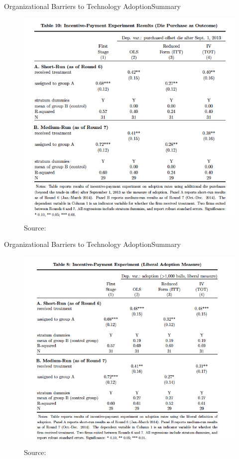 \documentclass{beamer}
\begin{document}
\begin{frame}{Organizational Barriers to Technology Adoption}{Summary}
\begin{figure}[h]
\begin{centering}
  \includegraphics[width=\textwidth]{atkin6}
  \caption{Source: \cite{Atkin2015}}
   \label{fig:atkin6}
\end{centering}
\end{figure}
\end{frame}

\begin{frame}{Organizational Barriers to Technology Adoption}{Summary}
\begin{figure}[h]
\begin{centering}
  \includegraphics[width=\textwidth]{atkin7}
  \caption{Source: \cite{Atkin2015}}
   \label{fig:atkin7}
\end{centering}
\end{figure}
\end{frame}
\end{document}
